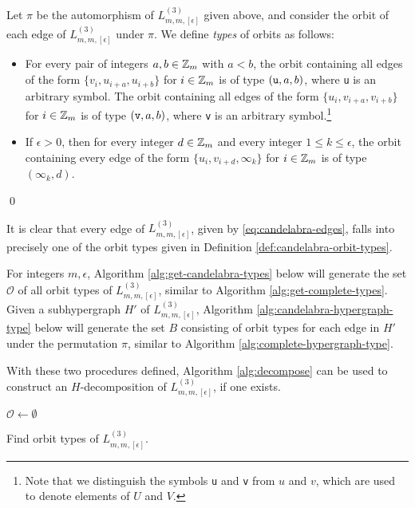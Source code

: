 \begin{definition} \label{def:candelabra-orbit-types}
Let $\pi$ be the automorphism of $L_{m,m,[\epsilon]}^{(3)}$ given above, and consider the orbit of each edge of $L_{m,m,[\epsilon]}^{(3)}$ under $\pi$. We define {\em types} of orbits as follows:
\begin{itemize}
    \item For every pair of integers $a, b \in \mathbb{Z}_m$ with $a < b$, the orbit containing all edges of the form $\{v_i, u_{i+a}, u_{i+b}\}$ for $i \in \mathbb{Z}_m$ is of type $({\tt u}, a, b)$, where {\tt u} is an arbitrary symbol. The orbit containing all edges of the form $\{u_i, v_{i+a}, v_{i+b}\}$ for $i \in \mathbb{Z}_m$ is of type $({\tt v}, a, b)$, where {\tt v} is an arbitrary symbol.\footnote{Note that we distinguish the symbols {\tt u} and {\tt v} from $u$ and $v$, which are used to denote elements of $U$ and $V$.}
    \item If $\epsilon > 0$, then for every integer $d \in \mathbb{Z}_m$ and every integer $1 \leq k \leq \epsilon$, the orbit containing every edge of the form $\{u_i, v_{i+d}, \infty_k\}$ for $i \in \mathbb{Z}_m$ is of type $(\infty_k, d)$.
\end{itemize}
\qed
\end{definition}

It is clear that every edge of $L_{m,m,[\epsilon]}^{(3)}$, given by \eqref{eq:candelabra-edges}, falls into precisely one of the orbit types given in Definition \ref{def:candelabra-orbit-types}.

For integers $m, \epsilon$, Algorithm \ref{alg:get-candelabra-types} below will generate the set $\mathcal{O}$ of all orbit types of $L_{m,m,[\epsilon]}^{(3)}$, similar to Algorithm \ref{alg:get-complete-types}.
Given a subhypergraph $H'$ of $L_{m,m,[\epsilon]}^{(3)}$, Algorithm \ref{alg:candelabra-hypergraph-type} below will generate the set $B$ consisting of orbit types for each edge in $H'$ under the permutation $\pi$, similar to Algorithm \ref{alg:complete-hypergraph-type}.

With these two procedures defined, Algorithm \ref{alg:decompose} can be used to construct an $H$-decomposition of $L_{m,m,[\epsilon]}^{(3)}$, if one exists.


\begin{algorithm}

$\mathcal{O} \gets \emptyset$\;



\;

\caption{Find orbit types of $L_{m,m,[\epsilon]}^{(3)}$.} \label{alg:get-candelabra-types}
\end{algorithm}

